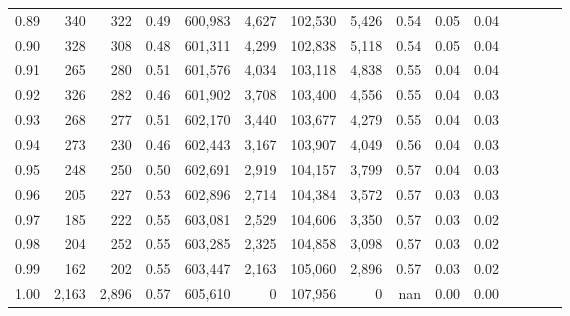 \begin{tabular}{rrrcrrrrrrrrrrr}
0.89 &     340 &    322 &                                       0.49 &  600,983 &    4,627 &  102,530 &    5,426 &  0.54 &  0.05 &                         0.04 \\
0.90 &     328 &    308 &                                       0.48 &  601,311 &    4,299 &  102,838 &    5,118 &  0.54 &  0.05 &                         0.04 \\
0.91 &     265 &    280 &                                       0.51 &  601,576 &    4,034 &  103,118 &    4,838 &  0.55 &  0.04 &                         0.04 \\
0.92 &     326 &    282 &                                       0.46 &  601,902 &    3,708 &  103,400 &    4,556 &  0.55 &  0.04 &                         0.03 \\
0.93 &     268 &    277 &                                       0.51 &  602,170 &    3,440 &  103,677 &    4,279 &  0.55 &  0.04 &                         0.03 \\
0.94 &     273 &    230 &                                       0.46 &  602,443 &    3,167 &  103,907 &    4,049 &  0.56 &  0.04 &                         0.03 \\
0.95 &     248 &    250 &                                       0.50 &  602,691 &    2,919 &  104,157 &    3,799 &  0.57 &  0.04 &                         0.03 \\
0.96 &     205 &    227 &                                       0.53 &  602,896 &    2,714 &  104,384 &    3,572 &  0.57 &  0.03 &                         0.03 \\
0.97 &     185 &    222 &                                       0.55 &  603,081 &    2,529 &  104,606 &    3,350 &  0.57 &  0.03 &                         0.02 \\
0.98 &     204 &    252 &                                       0.55 &  603,285 &    2,325 &  104,858 &    3,098 &  0.57 &  0.03 &                         0.02 \\
0.99 &     162 &    202 &                                       0.55 &  603,447 &    2,163 &  105,060 &    2,896 &  0.57 &  0.03 &                         0.02 \\
1.00 &   2,163 &  2,896 &                                       0.57 &  605,610 &        0 &  107,956 &        0 &   nan &  0.00 &                         0.00 \\
\bottomrule
\end{tabular}
